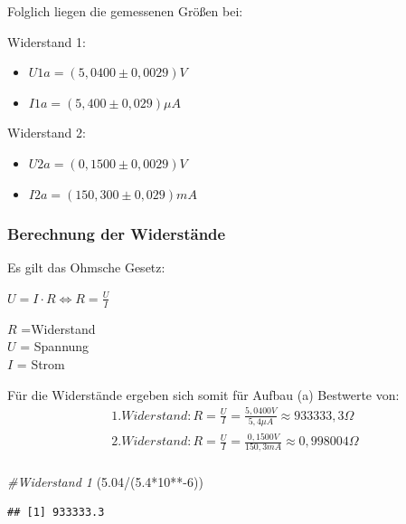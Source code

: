 \documentclass[
  9pt,
]{article}
\newenvironment{Shaded}{\begin{snugshade}}{\end{snugshade}}
\newcommand{\CommentTok}[1]{\textcolor[rgb]{0.56,0.35,0.01}{\textit{#1}}}
\newcommand{\DecValTok}[1]{\textcolor[rgb]{0.00,0.00,0.81}{#1}}
\newcommand{\FloatTok}[1]{\textcolor[rgb]{0.00,0.00,0.81}{#1}}
\newcommand{\NormalTok}[1]{#1}
\newcommand{\SpecialCharTok}[1]{\textcolor[rgb]{0.00,0.00,0.00}{#1}}
\begin{document}
Folglich liegen die gemessenen Größen bei:

Widerstand 1:

\begin{itemize}
\item $U1a = (5,0400 \pm 0,0029)V$
\item $I1a = (5,400 \pm 0,029) \mu A$
\end{itemize}

Widerstand 2:

\begin{itemize}
\item $U2a = (0,1500 \pm 0,0029)V$
\item $I2a = (150,300 \pm 0,029) mA$
\end{itemize}

\hypertarget{berechnung-der-widerstuxe4nde}{%
\subsubsection{Berechnung der
Widerstände}\label{berechnung-der-widerstuxe4nde}}

Es gilt das Ohmsche Gesetz:

\(U=I\cdot R \Leftrightarrow R = \frac{U}{I}\)

\noindent \(R\) =Widerstand\\
\noindent \(U\) = Spannung\\
\noindent \(I\) = Strom

Für die Widerstände ergeben sich somit für Aufbau (a) Bestwerte von:
\begin{equation*}
\begin{split}
1. Widerstand: R=\frac{U}{I} = \frac {5,0400V}{5,4 \mu A} \approx 933333,3 \Omega \\
2.Widerstand: R=\frac{U}{I} = \frac {0,1500V}{150,3 mA} \approx 0,998004 \Omega \\
\end{split}
\end{equation*}

\begin{Shaded}
\begin{Highlighting}[]
\CommentTok{\#Widerstand 1}
\NormalTok{(}\FloatTok{5.04}\SpecialCharTok{/}\NormalTok{(}\FloatTok{5.4}\SpecialCharTok{*}\DecValTok{10}\SpecialCharTok{**{-}}\DecValTok{6}\NormalTok{))}
\end{Highlighting}
\end{Shaded}

\begin{verbatim}
## [1] 933333.3
\end{verbatim}
\end{document}
